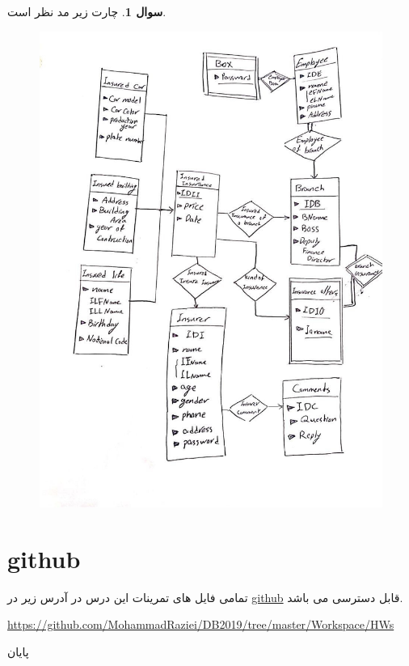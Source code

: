 \documentclass[12pt]{article}
\theoremstyle{definition}
\newtheorem{question}{سوال}
\begin{document}
\begin{question}
	چارت زیر مد نظر است.

\begin{figure}[h!]
\begin{center}
		\includegraphics[width = 0.49\linewidth]{chart}
\end{center}
\end{figure}
\end{question}








\section{github}\label{chpt2}
تمامی فایل های تمرینات این درس در آدرس زیر در 
\href{https://github.com/mohammadraziei/DB2019/}{github}
قابل دسترسی می باشد.

\begin{latin}
\begin{center}
\href{https://github.com/MohammadRaziei/DB2019/tree/master/Workspace/HWs}{https://github.com/MohammadRaziei/DB2019/tree/master/Workspace/HWs}
\end{center}
\end{latin}



\begin{center}
\vspace{1.5cm}
\huge
پایان
\end{center}
\end{document}
